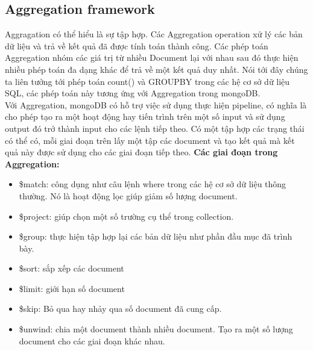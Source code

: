 \subsection{Aggregation framework}
Aggragation có thể hiểu là sự tập hợp. Các Aggregation operation xử lý các bản dữ liệu và trả về kết quả đã được tính toán thành công. Các phép toán Aggregation nhóm các giá trị từ nhiều Document lại với nhau sau đó thực hiện nhiều phép toán đa dạng khác để trả về một kết quả duy nhất. Nói tới đây chúng ta liên tưởng tới phép toán count() và GROUPBY trong các hệ cơ sở dữ liệu SQL, các phép toán này tương ứng với Aggregation trong mongoDB.\\
Với Aggregation, mongoDB có hỗ trợ việc sử dụng thực hiện pipeline, có nghĩa là cho phép tạo ra một hoạt động hay tiến trình trên một số input và sử dụng output đó trở thành input cho các lệnh tiếp theo. Có một tập hợp các trạng thái có thể có, mỗi giai đoạn trên lấy một tập các document và tạo kết quả mà kết quả này được sử dụng cho các giai đoạn tiếp theo.
\textbf{Các giai đoạn trong Aggregation:}
\begin{itemize}
	\item \$match: công dụng như câu lệnh where trong các hệ cơ sở dữ liệu thông thường. Nó là hoạt động lọc giúp giảm số lượng document.
	\item \$project: giúp chọn một số trường cụ thể trong collection.
	\item \$group: thực hiện tập hợp lại các bản dữ liệu như phần đầu mục đã trình bày.
	\item \$sort: sắp xếp các document
	\item \$limit: giới hạn số document
	\item \$skip: Bỏ qua hay nhảy qua số document đã cung cấp.
	\item \$unwind: chia một document thành nhiều document. Tạo ra một số lượng document cho các giai đoạn khác nhau.
\end{itemize}
\pagebreak
